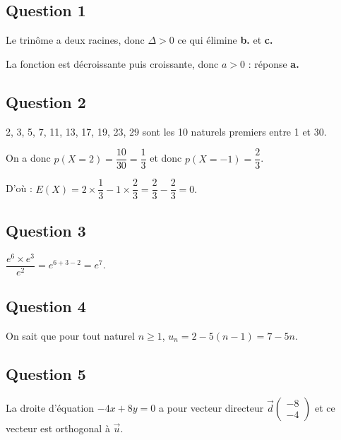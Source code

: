 \subsection*{Question 1}

Le trinôme a deux racines, donc \(\Delta > 0\) ce qui élimine \textbf{b.} et \textbf{c.}

La fonction est décroissante puis croissante, donc \(a > 0\) : réponse \textbf{a.}

\subsection*{Question 2}

2, 3, 5, 7, 11, 13, 17, 19, 23, 29 sont les 10 naturels premiers entre 1 et 30.
  
On a donc \(p(X = 2) = \dfrac{10}{30} = \dfrac{1}{3}\) et donc \(p(X = -1) = \dfrac{2}{3}\).

D'où : \(E(X) = 2 \times \dfrac{1}{3} - 1 \times \dfrac{2}{3} = \dfrac{2}{3} - \dfrac{2}{3} = 0.\)

\subsection*{Question 3}

\(\dfrac{e^6 \times e^3}{e^2} = e^{6+3-2} = e^7.\)

\subsection*{Question 4}

On sait que pour tout naturel \(n \geqslant 1\), \(u_n = 2 - 5(n - 1) = 7 - 5n\).

\subsection*{Question 5}

La droite d'équation \(-4x + 8y = 0\) a pour vecteur directeur \(\vec{d} \begin{pmatrix} -8 \\ -4 \end{pmatrix}\) et ce vecteur est orthogonal à \(\vec{u}\).
